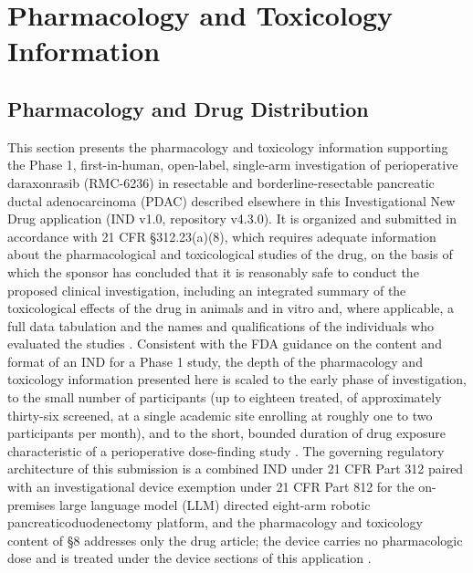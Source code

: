 \section{Pharmacology and Toxicology Information}

\subsection{Pharmacology and Drug Distribution}

This section presents the pharmacology and toxicology information supporting the
Phase 1, first-in-human, open-label, single-arm investigation of perioperative
daraxonrasib (RMC-6236) in resectable and borderline-resectable pancreatic
ductal adenocarcinoma (PDAC) described elsewhere in this Investigational New
Drug application (IND v1.0, repository v4.3.0). It is organized and submitted in
accordance with 21 CFR \S 312.23(a)(8), which requires adequate information
about the pharmacological and toxicological studies of the drug, on the basis of
which the sponsor has concluded that it is reasonably safe to conduct the
proposed clinical investigation, including an integrated summary of the
toxicological effects of the drug in animals and in vitro and, where applicable,
a full data tabulation and the names and qualifications of the individuals who
evaluated the studies \cite{phase1guidance}. Consistent with the FDA guidance on
the content and format of an IND for a Phase 1 study, the depth of the
pharmacology and toxicology information presented here is scaled to the early
phase of investigation, to the small number of participants (up to eighteen
treated, of approximately thirty-six screened, at a single academic site
enrolling at roughly one to two participants per month), and to the short,
bounded duration of drug exposure characteristic of a perioperative dose-finding
study \cite{phase1guidance}. The governing regulatory architecture of this
submission is a combined IND under 21 CFR Part 312 paired with an investigational
device exemption under 21 CFR Part 812 for the on-premises large language model
(LLM) directed eight-arm robotic pancreaticoduodenectomy platform, and the
pharmacology and toxicology content of \S 8 addresses only the drug article;
the device carries no pharmacologic dose and is treated under the device sections
of this application \cite{daraxwhipple,onpremwhippl}.

